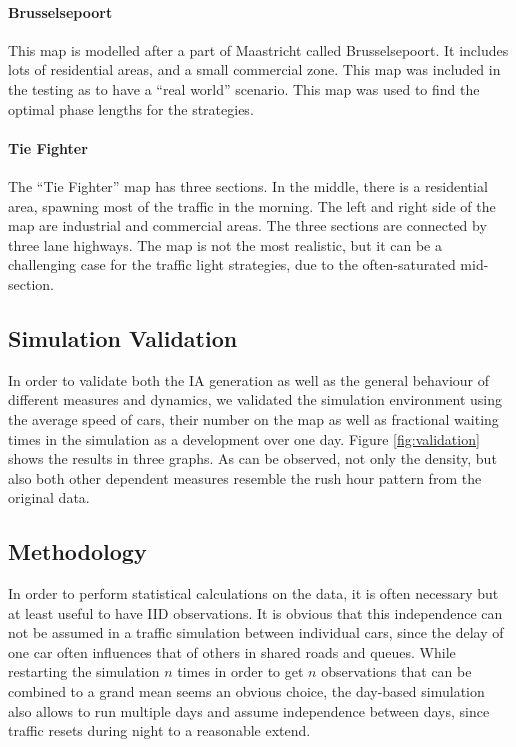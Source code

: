 \documentclass[11pt]{article}
\begin{document}
\paragraph{Brusselsepoort} This map is modelled after a part of Maastricht called Brusselsepoort. It includes lots of residential areas, and a small commercial zone. This map was included in the testing as to have a “real world” scenario. This map was used to find the optimal phase lengths for the strategies.

\paragraph{Tie Fighter} The “Tie Fighter” map has three sections. In the middle, there is a residential area, spawning most of the traffic in the morning. The left and right side of the map are industrial and commercial areas. The three sections are connected by three lane highways. The map is not the most realistic, but it can be a challenging case for the traffic light strategies, due to the often-saturated mid-section.

\subsection{Simulation Validation}
In order to validate both the IA generation as well as the general behaviour of different measures and dynamics, we validated the simulation environment using the average speed of cars, their number on the map as well as fractional waiting times in the simulation as a development over one day. Figure \ref{fig:validation} shows the results in three graphs. As can be observed, not only the density, but also both other dependent measures resemble the rush hour pattern from the original data.

\subsection{Methodology}
In order to perform statistical calculations on the data, it is often necessary but at least useful to have IID observations. It is obvious that this independence can not be assumed in a traffic simulation between individual cars, since the delay of one car often influences that of others in shared roads and queues. While restarting the simulation $n$ times in order to get $n$ observations that can be combined to a grand mean seems an obvious choice, the day-based simulation also allows to run multiple days and assume independence between days, since traffic resets during night to a reasonable extend.
\end{document}
